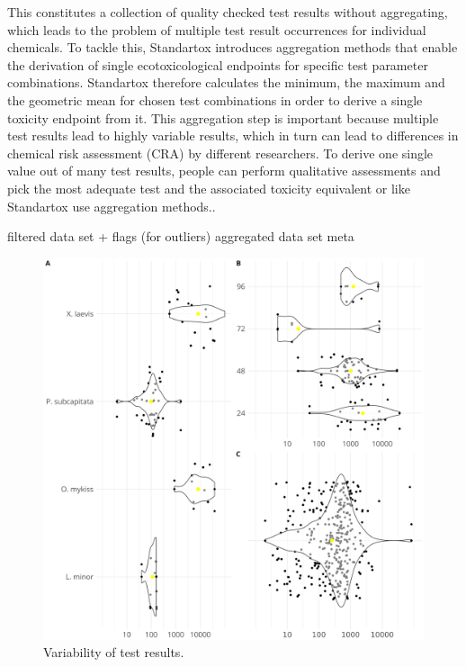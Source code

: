 This constitutes a collection of quality checked test results without aggregating, which leads to the problem of multiple test result occurrences for individual chemicals. To tackle this, Standartox introduces aggregation methods that enable the derivation of single ecotoxicological endpoints for specific test parameter combinations. Standartox therefore calculates the minimum, the maximum and the geometric mean for chosen test combinations in order to derive a single toxicity endpoint from it. This aggregation step is important because multiple test results lead to highly variable results, which in turn can lead to differences in chemical risk assessment (CRA) by different researchers. To derive one single value out of many test results, people can perform qualitative assessments and pick the most adequate test and the associated toxicity equivalent or like Standartox use aggregation methods..

filtered data set + flags (for outliers)
aggregated data set
meta

\begin{figure}
    \includegraphics[width=1.0\textwidth]{article/figures/results_variability.png}
    \caption{Variability of test results.}
    \label{fig:stx-organigram}
\end{figure}

